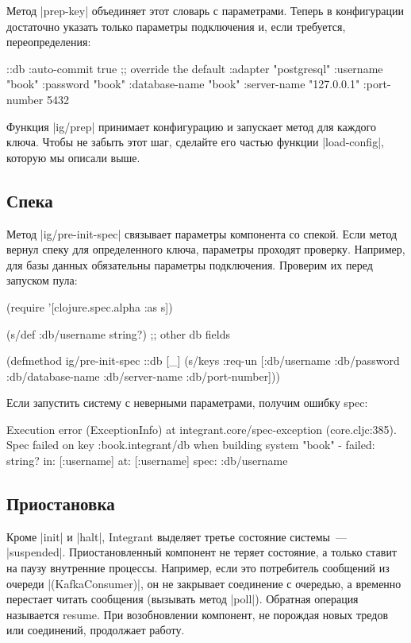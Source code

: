 Метод \spverb|prep-key| объединяет этот словарь с параметрами. Теперь в конфигурации
достаточно указать только параметры подключения и, если требуется,
переопределения:

\begin{code}
{::db {:auto-commit   true ;; override the default
       :adapter       "postgresql"
       :username      "book"
       :password      "book"
       :database-name "book"
       :server-name   "127.0.0.1"
       :port-number   5432}}
\end{code}

Функция \spverb|ig/prep| принимает конфигурацию и запускает метод для каждого
ключа. Чтобы не забыть этот шаг, сделайте его частью функции \spverb|load-config|,
которую мы описали выше.

\subsection{Спека}

Метод \spverb|ig/pre-init-spec| связывает параметры компонента со спекой. Если метод
вернул спеку для определенного ключа, параметры проходят проверку. Например, для
базы данных обязательны параметры подключения. Проверим их перед запуском пула:

\begin{code}
(require '[clojure.spec.alpha :as s])

(s/def :db/username string?)
;; other db fields

(defmethod ig/pre-init-spec ::db
  [_]
  (s/keys :req-un [:db/username
                   :db/password
                   :db/database-name
                   :db/server-name
                   :db/port-number]))
\end{code}

Если запустить систему с неверными параметрами, получим ошибку spec:

\begin{code}
Execution error (ExceptionInfo) at integrant.core/spec-exception (core.cljc:385).
Spec failed on key :book.integrant/db when building system
"book" - failed: string? in: [:username] at: [:username] spec: :db/username
\end{code}

\subsection{Приостановка}

Кроме \spverb|init| и \spverb|halt|, Integrant выделяет третье состояние системы~---
\spverb|suspended|. Приостановленный компонент не теряет состояние, а только ставит на
паузу внутренние процессы. Например, если это потребитель сообщений из очереди
\spverb|(KafkaConsumer)|, он не закрывает соединение с очередью, а временно перестает
читать сообщения (вызывать метод \spverb|poll|). Обратная операция называется
resume. При возобновлении компонент, не порождая новых тредов или соединений,
продолжает работу.

